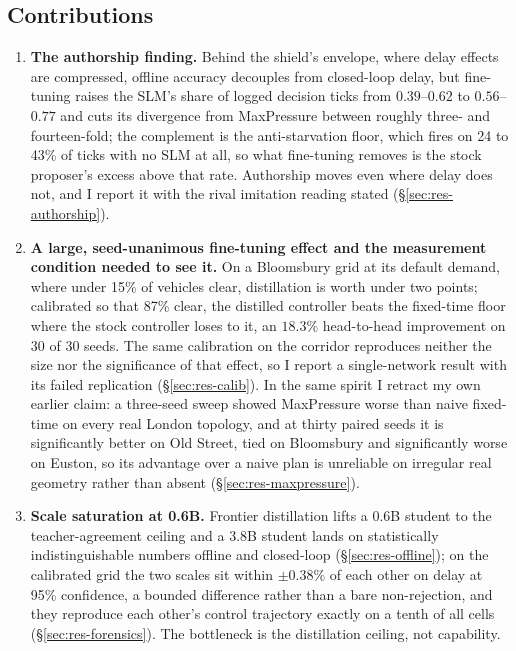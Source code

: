 \subsection{Contributions}\label{sec:intro-contributions}
\begin{enumerate}
\item \textbf{The authorship finding.} Behind the shield's envelope, where
delay effects are compressed, offline accuracy decouples from closed-loop
delay, but fine-tuning raises the SLM's share of logged decision ticks
from $0.39$--$0.62$ to $0.56$--$0.77$ and cuts its divergence from
MaxPressure between roughly three- and fourteen-fold; the complement is the
anti-starvation floor, which fires on 24 to 43\% of ticks with no SLM at
all, so what fine-tuning removes is the stock proposer's excess above that
rate. Authorship moves even where delay does not, and I report it with the
rival imitation reading stated (\S\ref{sec:res-authorship}).
\item \textbf{A large, seed-unanimous fine-tuning effect and the
measurement condition needed to see it.} On a Bloomsbury grid at its
default demand, where under 15\% of vehicles clear, distillation is worth
under two points; calibrated so that 87\% clear, the distilled controller
beats the fixed-time floor where the stock controller loses to it, an
$18.3\%$ head-to-head improvement on 30 of 30 seeds. The same calibration
on the corridor reproduces neither the size nor the significance of that
effect, so I report a single-network result with its failed replication
(\S\ref{sec:res-calib}). In the same spirit I retract my own earlier
claim: a three-seed sweep showed MaxPressure worse than naive fixed-time
on every real London topology, and at thirty paired seeds it is
significantly better on Old Street, tied on Bloomsbury and significantly
worse on Euston, so its advantage over a naive plan is unreliable on
irregular real geometry rather than absent (\S\ref{sec:res-maxpressure}).
\item \textbf{Scale saturation at 0.6B.} Frontier distillation lifts a
0.6B student to the teacher-agreement ceiling and a 3.8B student lands on
statistically indistinguishable numbers offline and closed-loop
(\S\ref{sec:res-offline}); on the calibrated grid the two scales sit
within $\pm0.38\%$ of each other on delay at 95\% confidence, a bounded
difference rather than a bare non-rejection, and they reproduce each
other's control trajectory exactly on a tenth of all cells
(\S\ref{sec:res-forensics}). The bottleneck is the distillation ceiling,
not capability.

\end{enumerate}
